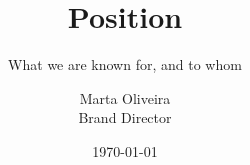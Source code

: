 \documentclass[aspectratio=169,11pt]{beamer}
\title{Position}
\subtitle{What we are known for, and to whom}
\author{Marta Oliveira \\ \small Brand Director}
\date{\today}
\begin{document}
\titleslide





\end{document}
